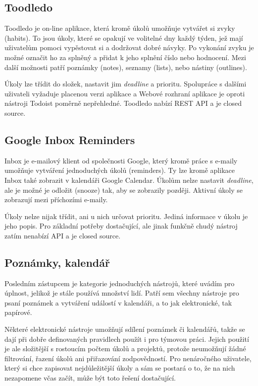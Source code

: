 \documentclass[thesis=B,czech]{FITthesis}[2012/06/26]
\begin{document}
		\subsection{Toodledo}
			Toodledo \cite{toodledo} je on-line aplikace, která kromě úkolů umožňuje vytvářet si zvyky (habits). To jsou úkoly, které se opakují ve volitelné dny každý týden, jež mají uživatelům pomoci vypěstovat si a dodržovat dobré návyky. Po vykonání zvyku je možné označit ho za splněný a přidat k jeho splnění číslo nebo hodnocení. Mezi další možnosti patří poznámky (notes), seznamy (lists), nebo nástiny (outlines). 
			
			Úkoly lze třídit do složek, nastavit jim \textit{deadline} a prioritu. Spolupráce s dalšími uživateli vyžaduje placenou verzi aplikace a Webové rozhraní aplikace je oproti nástroji Todoist poměrně nepřehledné. Toodledo nabízí REST API\cite{toodledo-api} a je closed source.
			
		\subsection{Google Inbox Reminders}
			Inbox \cite{ginbox} je e-mailový klient od společnosti Google, který kromě práce s e-maily umožňuje vytváření jednoduchých úkolů (reminders). Ty lze kromě aplikace Inbox také zobrazit v kalendáři Google Calendar.\cite{gcal} Úkolům nelze nastavit \textit{deadline}, ale je možné je odložit (snooze) tak, aby se zobrazily později. Aktivní úkoly se zobrazují mezi příchozími e-maily.
			
			Úkoly nelze nijak třídit, ani u nich určovat prioritu. Jediná informace v úkolu je jeho popis. Pro základní potřeby dostačující, ale jinak funkčně chudý nástroj zatím nenabízí API\cite{ginbox-no-api} a je closed source.
			
			
			
		\subsection{Poznámky, kalendář}
			Posledním zástupcem je kategorie jednoduchých nástrojů, které uvádím pro úplnost, jelikož je stále používá množství lidí. Patří sem všechny nástroje pro psaní poznámek a vytváření událostí v kalendáři, a to jak elektronické, tak papírové. 
			
			Některé elektronické nástroje umožňují sdílení poznámek či kalendářů, takže se dají při dobře definovaných pravidlech použít i pro týmovou práci. Jejich použití je ale složitější s rostoucím počtem úkolů a projektů, protože neumožňují žádné filtrování, řazení úkolů ani přiřazování zodpovědností. Pro nenáročného uživatele, který si chce zapisovat nejdůležitější úkoly a sám se postará o to, že na nich nezapomene včas začít, může být toto řešení dostačující.
			
\end{document}
